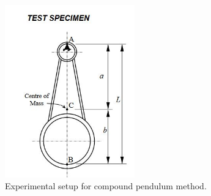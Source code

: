 \begin{figure}[H]
\centering
\includegraphics[width=0.5\textwidth]{chapters/lab1/m1}
\caption{Experimental setup for compound pendulum method.}
\label{fig:mesh2}
\end{figure}